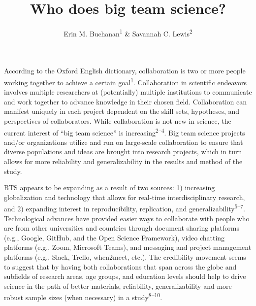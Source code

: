 \documentclass[
  man,floatsintext]{apa6}
\title{Who does big team science?}
\author{Erin M. Buchanan\textsuperscript{1} \& Savannah C. Lewis\textsuperscript{2}}
\date{}
\affiliation{\vspace{0.5cm}\textsuperscript{1} Harrisburg University of Science and Technology\\\textsuperscript{2} University of Alabama}
\begin{document}
\maketitle

According to the Oxford English dictionary, collaboration is two or more
people working together to achieve a certain goal\textsuperscript{1}.
Collaboration in scientific endeavors involves multiple researchers at
(potentially) multiple institutions to communicate and work together to
advance knowledge in their chosen field. Collaboration can manifest
uniquely in each project dependent on the skill sets, hypotheses, and
perspectives of collaborators. While collaboration is not new in
science, the current interest of ``big team science'' is increasing\textsuperscript{2--4}. Big team science projects
and/or organizations utilize and run on large-scale collaboration to
ensure that diverse populations and ideas are brought into research
projects, which in turn allows for more reliability and generalizability
in the results and method of the study.

BTS appears to be expanding as a result of two sources: 1) increasing
globalization and technology that allows for real-time interdisciplinary
research, and 2) expanding interest in reproducibility, replication, and
generalizability\textsuperscript{5--7}. Technological
advances have provided easier ways to collaborate with people who are
from other universities and countries through document sharing platforms
(e.g., Google, GitHub, and the Open Science Framework), video chatting
platforms (e.g., Zoom, Microsoft Teams), and messaging and project
management platforms (e.g., Slack, Trello, when2meet, etc.). The
credibility movement seems to suggest that by having both collaborations
that span across the globe and subfields of research areas, age groups,
and education levels should help to drive science in the path of better
materials, reliability, generalizability and more robust sample sizes
(when necessary) in a study\textsuperscript{8--10}.
\end{document}
